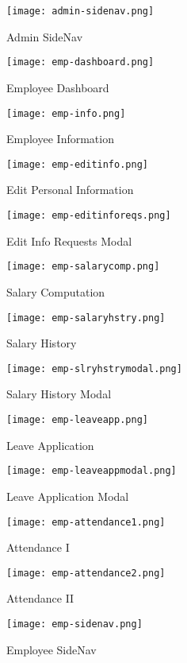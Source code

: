 \documentclass[journal]{./IEEE/IEEEtran}
\begin{document}
\begin{figure}[H]
    \centering
    \texttt{[image: admin-sidenav.png]}
    \caption{Admin SideNav}
\end{figure}

\begin{figure}[H]
    \centering
    \texttt{[image: emp-dashboard.png]}
    \caption{Employee Dashboard}
\end{figure}


\begin{figure}[H]
    \centering
    \texttt{[image: emp-info.png]}
    \caption{Employee Information}
\end{figure}

\begin{figure}[H]
    \centering
    \texttt{[image: emp-editinfo.png]}
    \caption{Edit Personal Information}

\end{figure}

\begin{figure}[H]
    \centering
    \texttt{[image: emp-editinforeqs.png]}
    \caption{Edit Info Requests Modal}
\end{figure}


\begin{figure}[H]
    \centering
    \texttt{[image: emp-salarycomp.png]}
    \caption{Salary Computation}
\end{figure}

\begin{figure}[H]
    \centering
    \texttt{[image: emp-salaryhstry.png]}
    \caption{Salary History}
\end{figure}

\begin{figure}[H]
    \centering
    \texttt{[image: emp-slryhstrymodal.png]}
    \caption{Salary History Modal}
\end{figure}

\begin{figure}[H]
    \centering
    \texttt{[image: emp-leaveapp.png]}
    \caption{Leave Application}
\end{figure}

\begin{figure}[H]
    \centering
    \texttt{[image: emp-leaveappmodal.png]}
    \caption{Leave Application Modal}
\end{figure}

\begin{figure}[H]
    \centering
    \texttt{[image: emp-attendance1.png]}
    \caption{Attendance I}
\end{figure}

\begin{figure}[H]
    \centering
    \texttt{[image: emp-attendance2.png]}
    \caption{Attendance II}
\end{figure}

\begin{figure}[H]
    \centering
    \texttt{[image: emp-sidenav.png]}
    \caption{Employee SideNav}
\end{figure}
\end{document}
